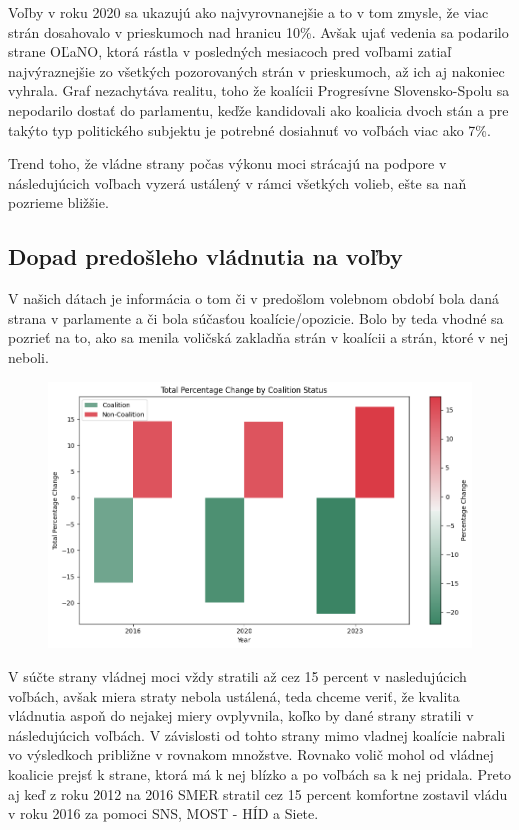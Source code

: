 \documentclass[main.tex]{subfiles}
\begin{document}
Voľby v roku 2020 sa ukazujú ako najvyrovnanejšie a to v tom zmysle, že viac strán dosahovalo v prieskumoch nad hranicu 10\%. Avšak ujať vedenia sa podarilo strane OĽaNO, ktorá rástla v posledných mesiacoch pred voľbami zatiaľ najvýraznejšie zo všetkých pozorovaných strán v prieskumoch, až ich aj nakoniec vyhrala. Graf nezachytáva realitu, toho že koalícii Progresívne Slovensko-Spolu sa nepodarilo dostať do parlamentu, keďže kandidovali ako koalicia dvoch stán a pre takýto typ politického subjektu je potrebné dosiahnuť vo voľbách viac ako 7\%. 

Trend toho, že vládne strany počas výkonu moci strácajú na podpore v následujúcich voľbach vyzerá ustálený v rámci všetkých volieb, ešte sa naň pozrieme bližšie. 

\subsection{Dopad predošleho vládnutia na voľby}

V našich dátach je informácia o tom či v predošlom volebnom období bola daná strana v parlamente a či bola súčasťou koalície/opozicie. Bolo by teda vhodné sa pozrieť na to, ako sa menila voličská zakladňa strán v koalícii a strán, ktoré v nej neboli. 

\begin{figure}[!htbp]
    \centering
    \includegraphics[width=\textwidth]{images_exploratory/Coalition_vs_NoCoalition.png}
    \caption{}
\end{figure}

V súčte strany vládnej moci vždy stratili až cez 15 percent v nasledujúcich voľbách, avšak miera straty nebola ustálená, teda chceme veriť, že kvalita vládnutia aspoň do nejakej miery ovplyvnila, koľko by dané strany stratili v následujúcich voľbách. V závislosti od tohto strany mimo vladnej koalície nabrali vo výsledkoch približne v rovnakom množstve. Rovnako volič mohol od vládnej koalicie prejsť k strane, ktorá má k nej blízko a po voľbách sa k nej pridala. Preto aj keď z roku 2012 na 2016 SMER stratil cez 15 percent komfortne zostavil vládu v roku 2016 za pomoci SNS, MOST - HÍD a Siete.
\end{document}
